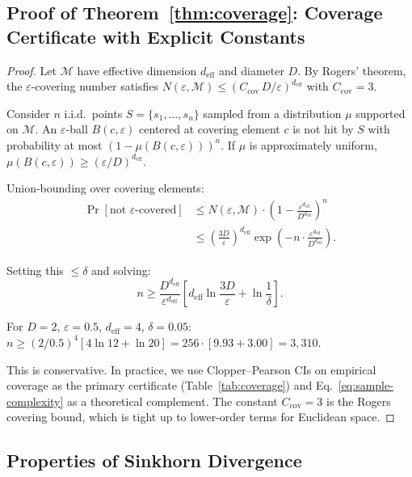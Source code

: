 \documentclass[10pt]{article}
\begin{document}
\subsection{Proof of Theorem~\ref{thm:coverage}: Coverage Certificate with Explicit Constants}

\begin{proof}
Let $\mathcal{M}$ have effective dimension $d_{\mathrm{eff}}$ and diameter $D$.
By Rogers' theorem, the $\varepsilon$-covering number satisfies
$N(\varepsilon, \mathcal{M}) \leq (C_{\mathrm{cov}}\, D / \varepsilon)^{d_{\mathrm{eff}}}$
with $C_{\mathrm{cov}} = 3$.

Consider $n$ i.i.d.\ points $S = \{s_1, \ldots, s_n\}$ sampled from a distribution $\mu$ supported on $\mathcal{M}$.
An $\varepsilon$-ball $B(c, \varepsilon)$ centered at covering element $c$ is not hit by $S$ with probability at most $(1 - \mu(B(c,\varepsilon)))^n$.
If $\mu$ is approximately uniform, $\mu(B(c,\varepsilon)) \geq (\varepsilon/D)^{d_{\mathrm{eff}}}$.

Union-bounding over covering elements:
\begin{align}
\Pr[\text{not } \varepsilon\text{-covered}]
&\leq N(\varepsilon, \mathcal{M}) \cdot \left(1 - \frac{\varepsilon^{d_{\mathrm{eff}}}}{D^{d_{\mathrm{eff}}}}\right)^n \\
&\leq \left(\frac{3D}{\varepsilon}\right)^{d_{\mathrm{eff}}} \exp\!\left(-n \cdot \frac{\varepsilon^{d_{\mathrm{eff}}}}{D^{d_{\mathrm{eff}}}}\right).
\end{align}

Setting this $\leq \delta$ and solving:
\begin{equation}
n \geq \frac{D^{d_{\mathrm{eff}}}}{\varepsilon^{d_{\mathrm{eff}}}} \left[d_{\mathrm{eff}} \ln\frac{3D}{\varepsilon} + \ln\frac{1}{\delta}\right].
\end{equation}

For $D = 2$, $\varepsilon = 0.5$, $d_{\mathrm{eff}} = 4$, $\delta = 0.05$:
$n \geq (2/0.5)^4 [4 \ln 12 + \ln 20] = 256 \cdot [9.93 + 3.00] = 3{,}310$.

This is conservative.
In practice, we use Clopper--Pearson CIs on empirical coverage as the primary certificate (Table~\ref{tab:coverage}) and Eq.~\eqref{eq:sample-complexity} as a theoretical complement.
The constant $C_{\mathrm{cov}} = 3$ is the Rogers covering bound, which is tight up to lower-order terms for Euclidean space.
\end{proof}

\subsection{Properties of Sinkhorn Divergence}
\end{document}
